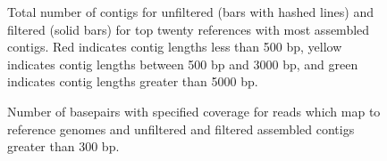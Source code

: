 \documentclass[11pt]{article} %
\begin{document}
\begin{landscape}
\begin{figure}[h!]
\caption{Total number of contigs for unfiltered (bars with hashed lines) and filtered (solid bars) for top twenty references with most assembled contigs.  Red indicates contig lengths less than 500 bp, yellow indicates contig lengths between 500 bp and 3000 bp, and green indicates contig lengths greater than 5000 bp.}
\label{contig-lengths}
\end{figure}
\end{landscape}


\begin{figure}[h!]
\caption{Number of basepairs with specified coverage for reads which map to reference genomes and unfiltered and filtered assembled contigs greater than 300 bp.}
\label{coveragehmp}
\end{figure}
\end{document}
